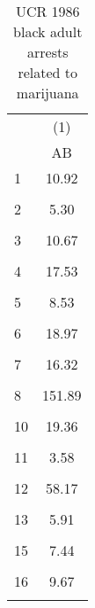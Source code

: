 \begin{table}[htbp]\centering
\caption{UCR 1986 black adult arrests related to marijuana }
\begin{tabular}{l*{1}{c}}
\hline\hline
                    &\multicolumn{1}{c}{(1)}\\
                    &\multicolumn{1}{c}{AB}\\
\hline
1                   &       10.92\\
                    &            \\
[1em]
2                   &        5.30\\
                    &            \\
[1em]
3                   &       10.67\\
                    &            \\
[1em]
4                   &       17.53\\
                    &            \\
[1em]
5                   &        8.53\\
                    &            \\
[1em]
6                   &       18.97\\
                    &            \\
[1em]
7                   &       16.32\\
                    &            \\
[1em]
8                   &      151.89\\
                    &            \\
[1em]
10                  &       19.36\\
                    &            \\
[1em]
11                  &        3.58\\
                    &            \\
[1em]
12                  &       58.17\\
                    &            \\
[1em]
13                  &        5.91\\
                    &            \\
[1em]
15                  &        7.44\\
                    &            \\
[1em]
16                  &        9.67\\
                    &            \\
[1em]

\end{tabular}
\end{table}
